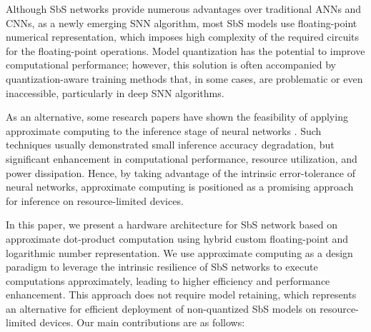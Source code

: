 Although SbS networks provide numerous advantages over traditional ANNs and CNNs, as a newly emerging SNN algorithm, most SbS models use floating-point numerical representation, which imposes high complexity of the required circuits for the floating-point operations. Model quantization has the potential to improve computational performance; however, this solution is often accompanied by quantization-aware training methods that, in some cases, are problematic or even inaccessible, particularly in deep SNN algorithms\cite{zhang2018survey}.

As an alternative, some research papers have shown the feasibility of applying approximate computing to the inference stage of neural networks \cite{lotrivc2012applicability, sarwar2016multiplier, mrazek2016design, du2014leveraging}. Such techniques usually demonstrated small inference accuracy degradation, but significant enhancement in computational performance, resource utilization, and power dissipation. Hence, by taking advantage of the intrinsic error-tolerance of neural networks, approximate computing is positioned as a promising approach for inference on resource-limited devices.

In this paper, we present a hardware architecture for SbS network based on approximate dot-product computation using hybrid custom floating-point and logarithmic number representation. We use approximate computing as a design paradigm to leverage the intrinsic resilience of SbS networks to execute computations approximately, leading to higher efficiency and performance enhancement. This approach does not require model retaining, which represents an alternative for efficient deployment of non-quantized SbS models on resource-limited devices. Our main contributions are as follows:

